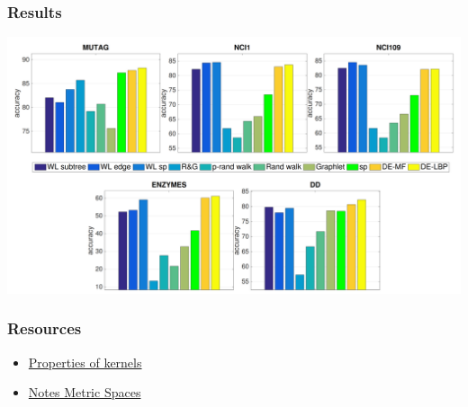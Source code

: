 \documentclass{beamer}
\begin{document}
    \begin{frame}
        \frametitle{Results}
        \begin{center}
        \includegraphics[width=\textwidth]{results.png}
        \end{center}
    \end{frame}

    \begin{frame}
        \frametitle{Resources}
        \begin{itemize}
            \item \href{https://people.eecs.berkeley.edu/~jordan/kernels/0521813972c03_p47-84.pdf}{Properties of kernels}
            \item \href{https://www.cs.mcgill.ca/~prakash/Courses/599/Notes/metric_spaces.pdf}{Notes Metric Spaces} \\
        \end{itemize}
    \end{frame}
\end{document}
